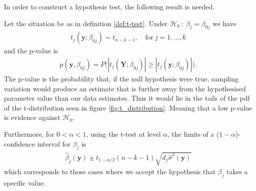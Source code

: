 In order to construct a hypothesis test, the following result is needed.

\begin{theorem}  \label{th:t_distribution}
Let the situation be as in definition \ref{def:t-test}. Under $\mathcal{H}_0 \ : \ \beta_j=\beta_{0j}$ we have 
\begin{align}
   t_j(\textbf{y};\beta_{0j})  \sim t_{n-k-1}, \quad \text{for} \ j=1,\ldots,k
\end{align}
and the p-value is
\begin{align}\label{eq:t_test_pvalue}
    p(\textbf{y},\beta_{0j})=P\Big(|t_j(\textbf{Y};\beta_{0j})|\geq |t_j(\textbf{y};\beta_{0j})|\Big).
\end{align}
The p-value is the probability that, if the null hypothesis were true, sampling variation would produce an estimate that is further away from the hypothesised parameter value than our data estimates.  
Thus it would lie in the tails of the pdf of the t-distribution seen in figure \ref{fig:t_distribution}.
Meaning that a low p-value is evidence against $\mathcal{H}_0$.

Furthermore, for $0<\alpha<1$, using the t-test at level $\alpha$, the limits of a ($1-\alpha$)-confidence interval for $\beta_j$ is
\begin{align} \label{eq:t_statistic}
    \hat{\beta}_{j}(\textbf{y}) \pm t_{1-\alpha/2}(n-k-1)\sqrt{d_j\hat{\sigma}^2(\textbf{y})}
\end{align}
which corresponds to those cases where we accept the hypothesis that $\beta_j$ takes a specific value.
\end{theorem}
